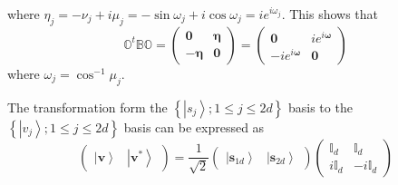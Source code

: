 \documentclass[aps,preprint]{revtex4}
\begin{document}
where $\eta _{j}=-\nu _{j}+i\mu _{j}=-\sin \omega _{j}+i\cos \omega
_{j}=ie^{i\omega _{j}}$. This shows that 
\begin{equation}
\mathbb{O}^{t}\mathbb{BO=}\left( 
\begin{array}{cc}
\mathbf{0} & \mathbf{\eta } \\ 
-\mathbf{\eta } & \mathbf{0}%
\end{array}%
\right) =\left( 
\begin{array}{cc}
\mathbf{0} & ie^{i\mathbf{\omega }} \\ 
-ie^{i\mathbf{\omega }} & \mathbf{0}%
\end{array}%
\right)
\end{equation}%
where $\omega _{j}=\cos ^{-1}\mu _{j}$.

The transformation form the $\left\{ \left\vert s_{j}\right\rangle ;1\leq
j\leq 2d\right\} $ basis to the $\left\{ \left\vert v_{j}\right\rangle
;1\leq j\leq 2d\right\} $ basis can be expressed as 
\begin{equation}
\left( 
\begin{array}{cc}
\left\vert \mathbf{v}\right\rangle & \left\vert \mathbf{v}^{\ast
}\right\rangle%
\end{array}%
\right) =\frac{1}{\sqrt{2}}\left( 
\begin{array}{cc}
\left\vert \mathbf{s}_{1d}\right\rangle & \left\vert \mathbf{s}%
_{2d}\right\rangle%
\end{array}%
\right) \left( 
\begin{array}{cc}
\mathbb{I}_{d} & \mathbb{I}_{d} \\ 
i\mathbb{I}_{d} & -i\mathbb{I}_{d}%
\end{array}%
\right)
\end{equation}
\end{document}

